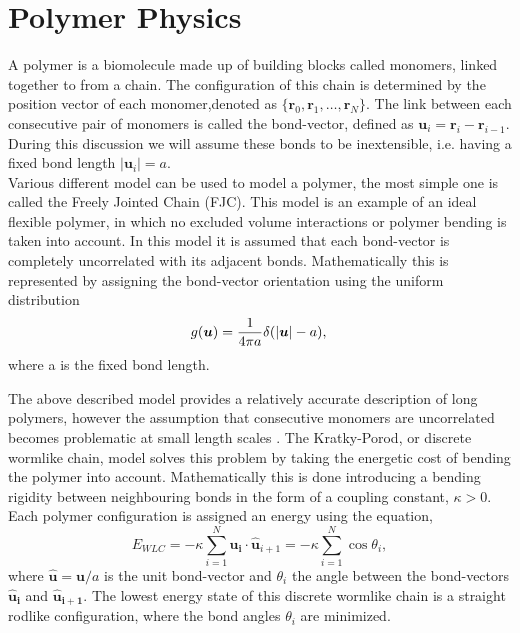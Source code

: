 \section{Polymer Physics}
A polymer is a biomolecule made up of building blocks called monomers, linked together to
from a chain. The configuration of this chain is determined by the position vector of
each monomer,denoted as $\{\boldsymbol{r}_0, \boldsymbol{r}_1, \dots,
\boldsymbol{r}_N\}$.  The link between each consecutive pair of monomers is called the
bond-vector, defined as
$\boldsymbol{u}_i = \boldsymbol{r}_i - \boldsymbol{r}_{i-1}$. During this discussion we
will assume these bonds to be inextensible, i.e. having a fixed
bond length $|\boldsymbol{u}_i| = a$.\\


Various different model can be used to model a polymer, the most simple one is called the
Freely Jointed Chain (FJC). This model is an example of an ideal flexible polymer, in
which no excluded volume interactions or polymer bending is taken into account. In this
model it is assumed that each bond-vector is completely uncorrelated with its adjacent
bonds. Mathematically this is represented by assigning the bond-vector orientation using
the uniform distribution
\begin{equation}
    g(\boldsymbol{u}) = \frac{1}{4 \pi a}
    \delta(|\boldsymbol{u}| - a), \\
\end{equation}
where a is the fixed bond length.


The above described model provides a relatively accurate description of long polymers,
however the assumption that consecutive monomers are uncorrelated becomes
problematic at small length scales . The Kratky-Porod, or discrete wormlike chain, model
solves this problem by taking the energetic cost of bending the polymer into
account. Mathematically this is done introducing a bending rigidity between neighbouring
bonds in the form of a coupling constant, $\kappa >0$. Each polymer configuration is
assigned an energy using the equation,
\begin{equation}
    E_{WLC}= -\kappa \sum_{i=1}^{N} \boldsymbol{\hat{u}_i} \cdot
    \boldsymbol{\hat{u}}_{i+1}
    = -\kappa
    \sum_{i=1}^{N} \cos\theta_i,
    \label{wlc}
\end{equation}
where $\boldsymbol{\hat{u}} = \boldsymbol{u}/a$ is the unit bond-vector and $\theta_i$
the angle between the  bond-vectors $\boldsymbol{\hat{u}_i}$ and
$\boldsymbol{\hat{u}_{i+1}}$. The lowest energy state of this discrete wormlike chain is
a straight rodlike configuration, where the bond angles $\theta_i$ are minimized.


